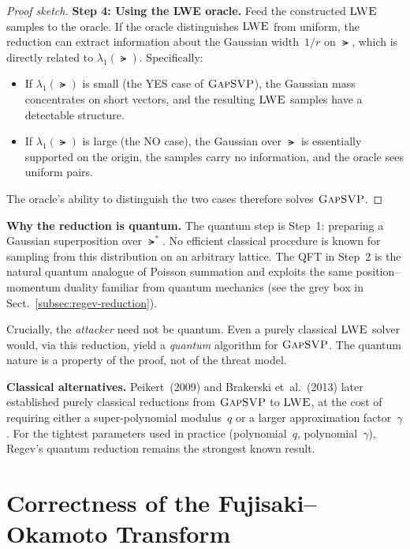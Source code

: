 \begin{proof}[Proof sketch]
\medskip\noindent\textbf{Step 4: Using the LWE oracle.}
Feed the constructed $\textsc{LWE}$ samples to the oracle.  If the
oracle distinguishes $\textsc{LWE}$ from uniform, the reduction can
extract information about the Gaussian width~$1/r$ on $\lat$,
which is directly related to $\lambda_1(\lat)$.  Specifically:
\begin{itemize}
\item If $\lambda_1(\lat)$ is small (the YES case of $\textsc{GapSVP}$),
  the Gaussian mass concentrates on short vectors, and the
  resulting $\textsc{LWE}$ samples have a detectable structure.
\item If $\lambda_1(\lat)$ is large (the NO case), the Gaussian
  over $\lat$ is essentially supported on the origin, the
  samples carry no information, and the oracle sees uniform
  pairs.
\end{itemize}
The oracle's ability to distinguish the two cases therefore
solves $\textsc{GapSVP}$.
\end{proof}

\medskip\noindent\textbf{Why the reduction is quantum.}
The quantum step is Step~1: preparing a Gaussian superposition
over $\lat^*$.  No efficient classical procedure is known for
sampling from this distribution on an arbitrary lattice.  The
QFT in Step~2 is the natural quantum analogue of Poisson
summation and exploits the same position--momentum duality
familiar from quantum mechanics (see the grey box in
Sect.~\ref{subsec:regev-reduction}).

Crucially, the \emph{attacker} need not be quantum.  Even a
purely classical $\textsc{LWE}$ solver would, via this reduction,
yield a \emph{quantum} algorithm for $\textsc{GapSVP}$.  The quantum
nature is a property of the proof, not of the threat model.

\begin{svgraybox}
\textbf{Classical alternatives.}
Peikert~(2009) and Brakerski et~al.~(2013) later established
purely classical reductions from $\textsc{GapSVP}$ to $\textsc{LWE}$, at the
cost of requiring either a super-polynomial modulus~$q$ or a
larger approximation factor~$\gamma$.  For the tightest
parameters used in practice (polynomial~$q$, polynomial~$\gamma$),
Regev's quantum reduction remains the strongest known result.
\end{svgraybox}


\section{Correctness of the Fujisaki--Okamoto Transform}
\label{app:fo-correctness}

